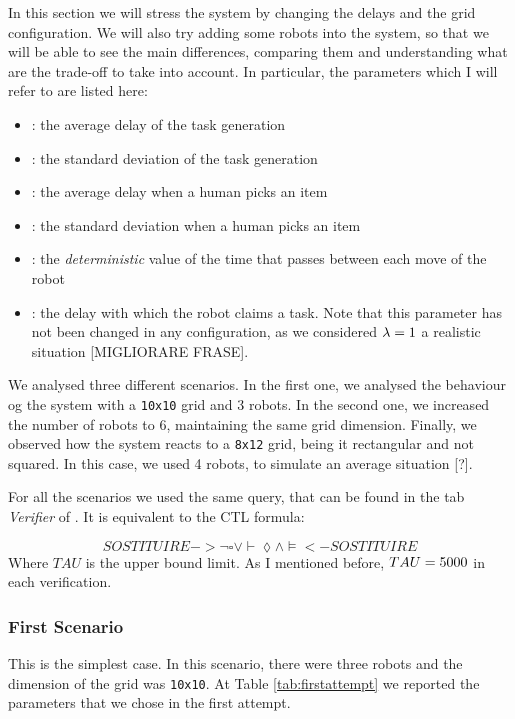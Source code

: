 In this section we will stress the system by changing the delays and the grid configuration. We will also try adding some robots into the system, so that we will be able to see the main differences, comparing them and understanding what are the trade-off to take into account. In particular, the parameters which I will refer to are listed here:
\begin{itemize}
    \item \mT: the average delay of the task generation
    \item \vT: the standard deviation of the task generation
    \item \mH: the average delay when a human picks an item
    \item \vH: the standard deviation when a human picks an item
    \item \K: the \emph{deterministic} value of the time that passes between each move of the robot
    \item \expdel: the delay with which the robot claims a task. Note that this parameter has not been changed in any configuration, as we considered $\lambda= 1$ a realistic situation [MIGLIORARE FRASE].
\end{itemize}

We analysed three different scenarios. In the first one, we analysed the behaviour og the system with a \texttt{10x10} grid and 3 robots. In the second one, we increased the number of robots to 6, maintaining the same grid dimension. Finally, we observed how the system reacts to a \texttt{8x12} grid, being it rectangular and not squared. In this case, we used 4 robots, to simulate an average situation [?].

For all the scenarios we used the same query, that can be found in the tab \emph{Verifier} of \UPPAAL. It is equivalent to the CTL formula:

\begin{equation}
    SOSTITUIRE ->  \lnot \square \vee \vdash \lozenge \wedge \models  <- SOSTITUIRE
\end{equation}
Where $TAU$ is the upper bound limit. As I mentioned before, $TAU = 5000$ in each verification.

\subsubsection{First Scenario}
This is the simplest case. In this scenario, there were three robots and the dimension of the grid was \texttt{10x10}. At Table \ref{tab:firstattempt} we reported the parameters that we chose in the first attempt.

